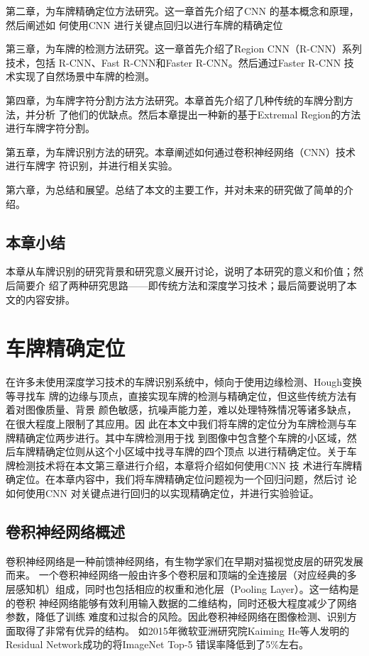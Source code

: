 第二章，为车牌精确定位方法研究。这一章首先介绍了CNN 的基本概念和原理，然后阐述如
何使用CNN 进行关键点回归以进行车牌的精确定位

第三章，为车牌的检测方法研究。这一章首先介绍了Region CNN（R-CNN）系列技术，包括
R-CNN、Fast R-CNN和Faster R-CNN。然后通过Faster R-CNN 技术实现了自然场景中车牌的检测。

第四章，为车牌字符分割方法方法研究。本章首先介绍了几种传统的车牌分割方法，并分析
了他们的优缺点。然后本章提出一种新的基于Extremal Region的方法进行车牌字符分割。

第五章，为车牌识别方法的研究。本章阐述如何通过卷积神经网络（CNN）技术进行车牌字
符识别，并进行相关实验。

第六章，为总结和展望。总结了本文的主要工作，并对未来的研究做了简单的介绍。

\section{本章小结}

本章从车牌识别的研究背景和研究意义展开讨论，说明了本研究的意义和价值；然后简要介
绍了两种研究思路——即传统方法和深度学习技术；最后简要说明了本文的内容安排。

\chapter{车牌精确定位}

在许多未使用深度学习技术的车牌识别系统中，倾向于使用边缘检测、Hough变换等寻找车
牌的边缘与顶点，直接实现车牌的检测与精确定位，但这些传统方法有着对图像质量、背景
颜色敏感，抗噪声能力差，难以处理特殊情况等诸多缺点，在很大程度上限制了其应用。因
此在本文中我们将车牌的定位分为车牌检测与车牌精确定位两步进行。其中车牌检测用于找
到图像中包含整个车牌的小区域，然后车牌精确定位则从这个小区域中找寻车牌的四个顶点
以进行精确定位。关于车牌检测技术将在本文第三章进行介绍，本章将介绍如何使用CNN 技
术进行车牌精确定位。在本章内容中，我们将车牌精确定位问题视为一个回归问题，然后讨
论如何使用CNN 对关键点进行回归的以实现精确定位，并进行实验验证。

\section{卷积神经网络概述}

卷积神经网络是一种前馈神经网络，有生物学家们在早期对猫视觉皮层的研究发展而来。
一个卷积神经网络一般由许多个卷积层和顶端的全连接层（对应经典的多
层感知机）组成，同时也包括相应的权重和池化层（Pooling Layer）。这一结构是的卷积
神经网络能够有效利用输入数据的二维结构，同时还极大程度减少了网络参数，降低了训练
难度和过拟合的风险。因此卷积神经网络在图像检测、识别方面取得了非常有优异的结构。
如2015年微软亚洲研究院Kaiming He等人发明的Residual Network成功的将ImageNet Top-5
错误率降低到了5\%左右\cite{He:2015tt}\cite{He:2016tq}。

